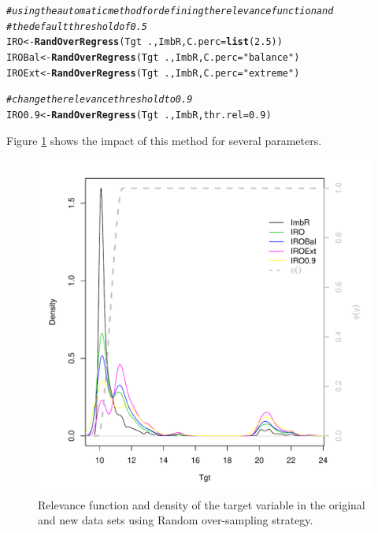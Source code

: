 \documentclass[10pt,a4paper]{article}\usepackage[]{graphicx}\usepackage[]{color}
\makeatletter
\def\maxwidth{ %
  \ifdim\Gin@nat@width>\linewidth
    \linewidth
  \else
    \Gin@nat@width
  \fi
}
\newcommand{\hlnum}[1]{\textcolor[rgb]{0.686,0.059,0.569}{#1}}%
\newcommand{\hlstr}[1]{\textcolor[rgb]{0.192,0.494,0.8}{#1}}%
\newcommand{\hlcom}[1]{\textcolor[rgb]{0.678,0.584,0.686}{\textit{#1}}}%
\newcommand{\hlopt}[1]{\textcolor[rgb]{0,0,0}{#1}}%
\newcommand{\hlstd}[1]{\textcolor[rgb]{0.345,0.345,0.345}{#1}}%
\newcommand{\hlkwb}[1]{\textcolor[rgb]{0.69,0.353,0.396}{#1}}%
\newcommand{\hlkwc}[1]{\textcolor[rgb]{0.333,0.667,0.333}{#1}}%
\newcommand{\hlkwd}[1]{\textcolor[rgb]{0.737,0.353,0.396}{\textbf{#1}}}%
\newenvironment{kframe}{%
 \def\at@end@of@kframe{}%
 \ifinner\ifhmode%
  \def\at@end@of@kframe{\end{minipage}}%
  \begin{minipage}{\columnwidth}%
 \fi\fi%
 \def\FrameCommand##1{\hskip\@totalleftmargin \hskip-\fboxsep
 \colorbox{shadecolor}{##1}\hskip-\fboxsep
     \hskip-\linewidth \hskip-\@totalleftmargin \hskip\columnwidth}%
 \MakeFramed {\advance\hsize-\width
   \@totalleftmargin\z@ \linewidth\hsize
   \@setminipage}}%
 {\par\unskip\endMakeFramed%
 \at@end@of@kframe}
\newenvironment{knitrout}{}{} %
\makeatother
\begin{document}
\begin{knitrout}\footnotesize
{}\color{fgcolor}\begin{kframe}
\begin{alltt}
\hlcom{# using the automatic method for defining the relevance function and}
\hlcom{# the default threshold of 0.5}
\hlstd{IRO} \hlkwb{<-} \hlkwd{RandOverRegress}\hlstd{(Tgt}\hlopt{~}\hlstd{., ImbR,} \hlkwc{C.perc}\hlstd{=}\hlkwd{list}\hlstd{(}\hlnum{2.5}\hlstd{))}
\hlstd{IROBal} \hlkwb{<-} \hlkwd{RandOverRegress}\hlstd{(Tgt}\hlopt{~}\hlstd{., ImbR,} \hlkwc{C.perc}\hlstd{=}\hlstr{"balance"}\hlstd{)}
\hlstd{IROExt} \hlkwb{<-} \hlkwd{RandOverRegress}\hlstd{(Tgt}\hlopt{~}\hlstd{., ImbR,} \hlkwc{C.perc}\hlstd{=}\hlstr{"extreme"}\hlstd{)}

\hlcom{# change the relevance threshold to 0.9}
\hlstd{IRO0.9} \hlkwb{<-} \hlkwd{RandOverRegress}\hlstd{(Tgt}\hlopt{~}\hlstd{., ImbR,} \hlkwc{thr.rel}\hlstd{=}\hlnum{0.9}\hlstd{)}
\end{alltt}
\end{kframe}
\end{knitrout}


Figure \ref{fig:RO_ex1} shows the impact of this method for several parameters.

\begin{knitrout}\footnotesize
{}\color{fgcolor}\begin{figure}

{\centering \includegraphics[width=\maxwidth]{figures/UBL-RO_ex1-1} 

}

\caption[Relevance function and density of the target variable in the original and new data sets using Random over-sampling strategy]{Relevance function and density of the target variable in the original and new data sets using Random over-sampling strategy.}\label{fig:RO_ex1}
\end{figure}


\end{knitrout}
\end{document}
